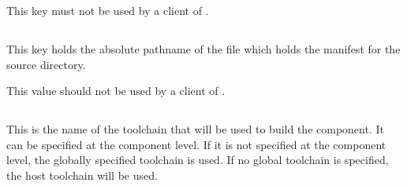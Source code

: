 This key must not be used by a client of \lmsbw.


\subsection{}\label{variables:source-mtree-manifest}

This key holds the absolute pathname of the file which holds the
\mtree manifest for the source directory.

This value should not be used by a client of \lmsbw.


\subsection{}\label{variables:toolchain}

This is the name of the toolchain that will be used to build the
component.  It can be specified at the component level.  If it is not
specified at the component level, the globally specified toolchain is
used.  If no global toolchain is specified, the host toolchain will be
used.


